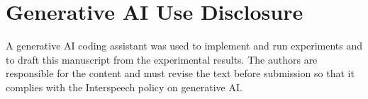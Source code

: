 \documentclass{Interspeech}
\begin{document}
\section{Generative AI Use Disclosure}
A generative AI coding assistant was used to implement and run experiments and to draft this manuscript
from the experimental results. The authors are responsible for the content and must revise the text
before submission so that it complies with the Interspeech policy on generative AI.



\end{document}
